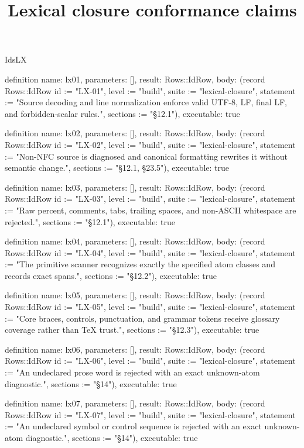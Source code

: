 \begin{lexlean}{IdsLX}
\title{Lexical closure conformance claims}
\begin{semanticmodule}
definition{
  name: lx01,
  parameters: [],
  result: Rows::IdRow,
  body: (record Rows::IdRow {id := "LX-01", level := "build", suite := "lexical-closure", statement := "Source decoding and line normalization enforce valid UTF-8, LF, final LF, and forbidden-scalar rules.", sections := "§12.1"}),
  executable: true
}

definition{
  name: lx02,
  parameters: [],
  result: Rows::IdRow,
  body: (record Rows::IdRow {id := "LX-02", level := "build", suite := "lexical-closure", statement := "Non-NFC source is diagnosed and canonical formatting rewrites it without semantic change.", sections := "§12.1, §23.5"}),
  executable: true
}

definition{
  name: lx03,
  parameters: [],
  result: Rows::IdRow,
  body: (record Rows::IdRow {id := "LX-03", level := "build", suite := "lexical-closure", statement := "Raw percent, comments, tabs, trailing spaces, and non-ASCII whitespace are rejected.", sections := "§12.1"}),
  executable: true
}

definition{
  name: lx04,
  parameters: [],
  result: Rows::IdRow,
  body: (record Rows::IdRow {id := "LX-04", level := "build", suite := "lexical-closure", statement := "The primitive scanner recognizes exactly the specified atom classes and records exact spans.", sections := "§12.2"}),
  executable: true
}

definition{
  name: lx05,
  parameters: [],
  result: Rows::IdRow,
  body: (record Rows::IdRow {id := "LX-05", level := "build", suite := "lexical-closure", statement := "Core braces, controls, punctuation, and grammar tokens receive glossary coverage rather than TeX trust.", sections := "§12.3"}),
  executable: true
}

definition{
  name: lx06,
  parameters: [],
  result: Rows::IdRow,
  body: (record Rows::IdRow {id := "LX-06", level := "build", suite := "lexical-closure", statement := "An undeclared prose word is rejected with an exact unknown-atom diagnostic.", sections := "§14"}),
  executable: true
}

definition{
  name: lx07,
  parameters: [],
  result: Rows::IdRow,
  body: (record Rows::IdRow {id := "LX-07", level := "build", suite := "lexical-closure", statement := "An undeclared symbol or control sequence is rejected with an exact unknown-atom diagnostic.", sections := "§14"}),
  executable: true
}


\end{semanticmodule}
\end{lexlean}
